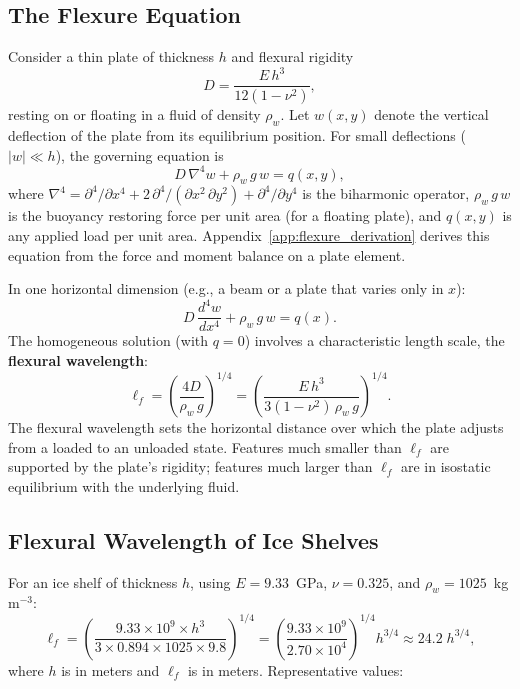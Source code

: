 \documentclass[11pt]{article}
\begin{document}
\subsection{The Flexure Equation}
\label{sec:flexure_equation}

Consider a thin plate of thickness $h$ and flexural rigidity
\begin{equation}
  D = \frac{E\,h^3}{12(1-\nu^2)},
  \label{eq:flexural_rigidity}
\end{equation}
resting on or floating in a fluid of density $\rho_w$.  Let $w(x,y)$ denote the vertical deflection of the plate from its equilibrium position.  For small deflections ($|w| \ll h$), the governing equation is
\begin{equation}
  \boxed{D\,\nabla^4 w + \rho_w\,g\,w = q(x,y),}
  \label{eq:plate_flexure}
\end{equation}
where $\nabla^4 = \partial^4/\partial x^4 + 2\,\partial^4/(\partial x^2\,\partial y^2) + \partial^4/\partial y^4$ is the biharmonic operator, $\rho_w\,g\,w$ is the buoyancy restoring force per unit area (for a floating plate), and $q(x,y)$ is any applied load per unit area.  Appendix~\ref{app:flexure_derivation} derives this equation from the force and moment balance on a plate element.

\medskip
\noindent In one horizontal dimension (e.g., a beam or a plate that varies only in $x$):
\begin{equation}
  D\,\frac{d^4 w}{dx^4} + \rho_w\,g\,w = q(x).
  \label{eq:beam_flexure}
\end{equation}
The homogeneous solution (with $q = 0$) involves a characteristic length scale, the \textbf{flexural wavelength}:
\begin{equation}
  \boxed{\ell_f = \left(\frac{4D}{\rho_w\,g}\right)^{1/4} = \left(\frac{E\,h^3}{3(1-\nu^2)\,\rho_w\,g}\right)^{1/4}.}
  \label{eq:flexural_wavelength}
\end{equation}
The flexural wavelength sets the horizontal distance over which the plate adjusts from a loaded to an unloaded state.  Features much smaller than $\ell_f$ are supported by the plate's rigidity; features much larger than $\ell_f$ are in isostatic equilibrium with the underlying fluid.

\subsection{Flexural Wavelength of Ice Shelves}

For an ice shelf of thickness $h$, using $E = 9.33$~GPa, $\nu = 0.325$, and $\rho_w = 1025$~kg\,m$^{-3}$:
\begin{equation}
  \ell_f = \left(\frac{9.33 \times 10^9 \times h^3}{3 \times 0.894 \times 1025 \times 9.8}\right)^{1/4} = \left(\frac{9.33 \times 10^9}{2.70 \times 10^4}\right)^{1/4} h^{3/4} \approx 24.2\;h^{3/4},
  \label{eq:lf_ice}
\end{equation}
where $h$ is in meters and $\ell_f$ is in meters.  Representative values:
\end{document}

